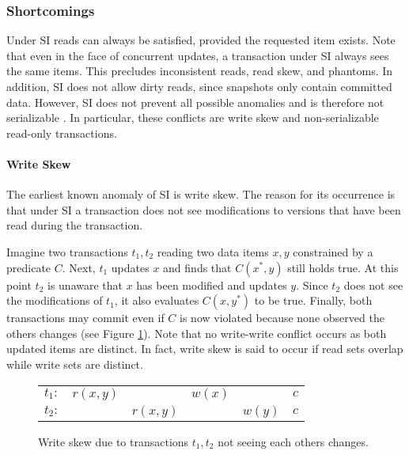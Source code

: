 \vfill

\subsubsection{Shortcomings}

Under \ac{SI} reads can always be satisfied, provided the requested item exists.
Note that even in the face of concurrent updates, a transaction under \ac{SI}
always sees the same items. This precludes inconsistent reads, read skew, and
phantoms. In addition, \ac{SI} does not allow dirty reads, since snapshots only
contain committed data. However, \ac{SI} does not prevent all possible anomalies
and is therefore not serializable \cite{berenson1995critique, fekete2004read}.
In particular, these conflicts are write skew and non-serializable read-only
transactions.

\paragraph{Write Skew}

The earliest known anomaly of \ac{SI} is write skew. The reason for its
occurrence is that under \ac{SI} a transaction does not see modifications to
versions that have been read during the transaction.

Imagine two transactions $t_1, t_2$ reading two data items $x, y$ constrained by
a predicate $C$. Next, $t_1$ updates $x$ and finds that $C(x^{*}, y)$ still
holds true. At this point $t_2$ is unaware that $x$ has been modified and
updates $y$. Since $t_2$ does not see the modifications of $t_1$, it also
evaluates $C(x, y^{*})$ to be true. Finally, both transactions may commit even
if $C$ is now violated because none observed the others changes (see Figure
\ref{fig:write_skew}). Note that no write-write conflict occurs as both updated
items are distinct. In fact, write skew is said to occur if read sets overlap
while write sets are distinct.

\begin{figure}[!h]
    \centering
    \begin{tabular}{r c c c c c}
        $t_1:$ & $r(x,y)$ &          & $w(x)$ &        & $c$ \\
        $t_2:$ &          & $r(x,y)$ &        & $w(y)$ & $c$ \\
    \end{tabular}
    \caption{Write skew due to transactions $t_1, t_2$ not seeing each others changes.}
    \label{fig:write_skew}
\end{figure}

